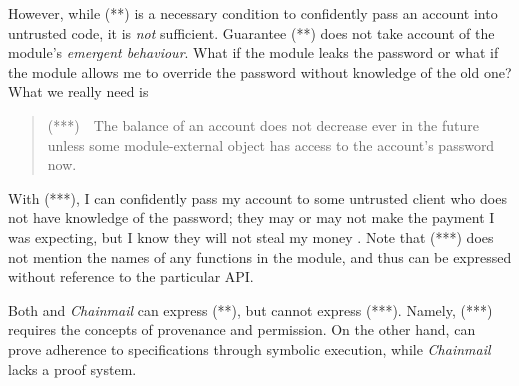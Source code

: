  
\vspace{.04in}

However, while (**) is a necessary condition  to confidently pass 
 an account into untrusted code, it is \emph{not} sufficient.
Guarantee (**) does not take  account of the module's \emph{emergent behaviour}.
 What if the module leaks the password or what if the module allows me to override the
 password without knowledge of the old one? 
 What we really need is
 \begin{quote}
(***)\  \ The balance of an account does not decrease ever in the future unless some module-external 
object has access to the account's password now.
\end{quote}
With (***), I can confidently pass my account to some untrusted client who
  does not have
 knowledge of the password; they may or may not make the payment I was expecting, but I
 know they will not steal my money \cite{ooToSecurity,miller-esop2013}.
 Note that (***)  does not mention
 the names of any functions in the module, and 
 thus can be expressed without reference to the particular API. 
 

  Both {} and  \emph{Chainmail} can express (**), but {}  cannot express (***). 
  Namely, (***)  requires the concepts of provenance and permission.
 On the other hand, {} can prove adherence to  specifications through symbolic 
  execution, while  \emph{Chainmail}   lacks a proof system. 
  
\vspace{.04in}

